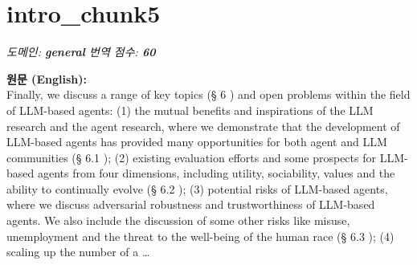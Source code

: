 \documentclass[12pt,a4paper]{article}
\begin{document}
\vspace{1em}

\section{intro\_chunk5}
\noindent\textit{\small 도메인: \textbf{general} \quad 번역 점수: \textbf{\color{orange!80!black}60}}
\vspace{0.5em}

\begin{mdframed}[style=orig]
\noindent\textbf{\small 원문 (English):}\\[2pt]
\small Finally, we discuss a range of key topics (§ 6 ) and open problems within the field of LLM-based agents: (1) the mutual benefits and inspirations of the LLM research and the agent research, where we demonstrate that the development of LLM-based agents has provided many opportunities for both agent and LLM communities (§ 6.1 ); (2) existing evaluation efforts and some prospects for LLM-based agents from four dimensions, including utility, sociability, values and the ability to continually evolve (§ 6.2 ); (3) potential risks of LLM-based agents, where we discuss adversarial robustness and trustworthiness of LLM-based agents. We also include the discussion of some other risks like misuse, unemployment and the threat to the well-being of the human race (§ 6.3 ); (4) scaling up the number of a \ldots
\end{mdframed}
\vspace{0.4em}
\end{document}
